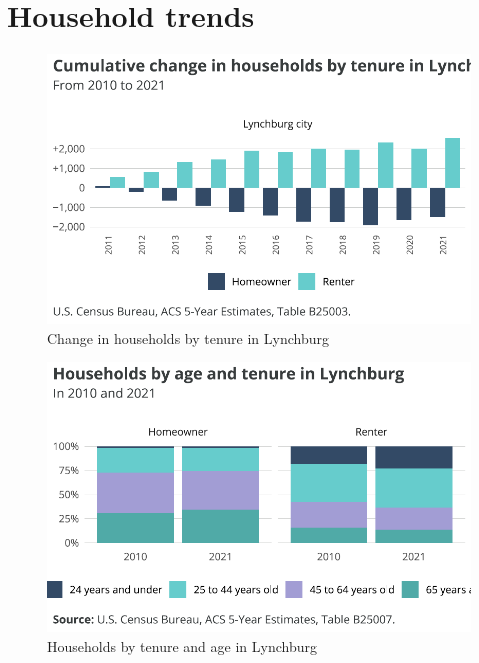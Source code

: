 \documentclass[
  letterpaper,
  DIV=11,
  numbers=noendperiod]{scrreprt}
\begin{document}
\hypertarget{household-trends-2}{%
\section{Household trends}\label{household-trends-2}}

\begin{figure}[H]

{\centering \includegraphics{./part-3-3_files/figure-pdf/fig-tenure-1.pdf}

}

\caption{\label{fig-tenure}Change in households by tenure in Lynchburg}

\end{figure}

\begin{figure}[H]

{\centering \includegraphics{./part-3-3_files/figure-pdf/fig-age-1.pdf}

}

\caption{\label{fig-age}Households by tenure and age in Lynchburg}

\end{figure}
\end{document}
